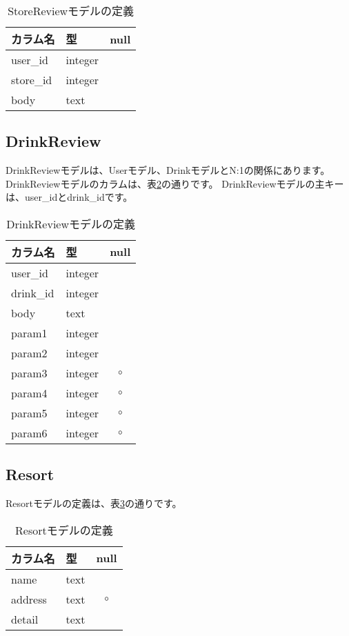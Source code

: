 \documentclass[a4j,titlepage]{jarticle}
\begin{document}
\begin{table}[!htbp]
\caption{StoreReviewモデルの定義}
\label{store_review}
\small
\begin{center}
\begin{tabular}{|l|l|c|}\hline
カラム名 & 型 & null \\\hline\hline
user\_id & integer & \\\hline
store\_id & integer & \\\hline
body & text & \\\hline
\end{tabular}
\end{center}
\end{table}

\subsection{DrinkReview}
DrinkReviewモデルは、Userモデル、DrinkモデルとN:1の関係にあります。
DrinkReviewモデルのカラムは、表\ref{drink_review}の通りです。
DrinkReviewモデルの主キーは、user\_idとdrink\_idです。

\begin{table}[!htbp]
\caption{DrinkReviewモデルの定義}
\label{drink_review}
\small
\begin{center}
\begin{tabular}{|l|l|c|}\hline
カラム名 & 型 & null \\\hline\hline
user\_id & integer & \\\hline
drink\_id & integer & \\\hline
body & text & \\\hline
param1 & integer & \\\hline
param2 & integer & \\\hline
param3 & integer & $\circ$ \\\hline
param4 & integer & $\circ$ \\\hline
param5 & integer & $\circ$ \\\hline
param6 & integer & $\circ$ \\\hline
\end{tabular}
\end{center}
\end{table}

\subsection{Resort}
Resortモデルの定義は、表\ref{resort}の通りです。

\begin{table}[!htbp]
\caption{Resortモデルの定義}
\label{resort}
\small
\begin{center}
\begin{tabular}{|l|l|c|}\hline
カラム名 & 型 & null \\\hline\hline
name & text & \\\hline
address & text & $\circ$ \\\hline
detail & text & \\\hline
\end{tabular}
\end{center}
\end{table}
\end{document}
